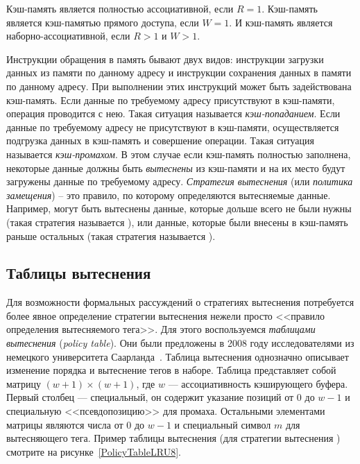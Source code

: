 Кэш-память является полностью ассоциативной, если $R = 1$.
Кэш-память является кэш-памятью прямого доступа, если $W = 1$. И
кэш-память является наборно-ассоциативной, если $R > 1$ и $W > 1$.

Инструкции обращения в память бывают двух видов: инструкции загрузки
данных из памяти по данному адресу и инструкции сохранения данных в
памяти по данному адресу. При выполнении этих инструкций может быть
задействована кэш-память. Если данные по требуемому адресу
присутствуют в кэш-памяти, операция проводится с нею. Такая ситуация
называется \emph{кэш-попаданием}. Если данные по требуемому адресу
не присутствуют в кэш-памяти, осуществляется подгрузка данных в
кэш-память и совершение операции. Такая ситуация называется
\emph{кэш-промахом}. В этом случае если кэш-память полностью
заполнена, некоторые данные должны быть \emph{вытеснены} из
кэш-памяти и на их место будут загружены данные по требуемому
адресу. \emph{Стратегия вытеснения} (или \emph{политика замещения})
-- это правило, по которому определяются вытесняемые данные.
Например, могут быть вытеснены данные, которые дольше всего не были
нужны (такая стратегия называется \LRU), или данные, которые были
внесены в кэш-память раньше остальных (такая стратегия называется
\FIFO).

\subsection{Таблицы вытеснения}

Для возможности формальных рассуждений о стратегиях вытеснения
потребуется более явное определение стратегии вытеснения нежели
просто <<правило определения вытесняемого тега>>. Для этого
воспользуемся \emph{таблицами вытеснения} (\emph{policy table}). Они
были предложены в 2008 году исследователями из немецкого
университета Саарланда~\cite{policy_tables}. Таблица вытеснения
однозначно описывает изменение порядка и вытеснение тегов в наборе.
Таблица представляет собой матрицу $(w{+}1) \times (w{+}1)$, где $w$
--- ассоциативность кэширующего буфера. Первый столбец ---
специальный, он содержит указание позиций от 0 до $w{-}1$ и
специальную <<псевдопозицию>> для промаха. Остальными элементами
матрицы являются числа от 0 до $w{-}1$ и специальный символ $m$ для
вытесняющего тега. Пример таблицы вытеснения (для стратегии
вытеснения \LRU) смотрите на рисунке~\ref{PolicyTableLRU8}.

